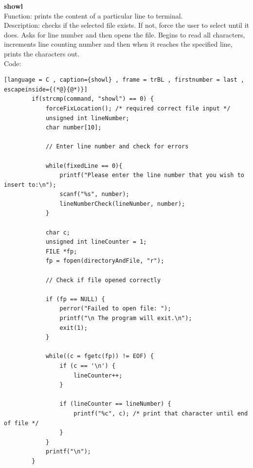 \documentclass[a4paper]{article}
\theoremstyle{plain}
\theoremstyle{definition}
\theoremstyle{remark}
\begin{document}
\textbf{showl} \\
Function: prints the content of a particular line to terminal. \\
Description: checks if the selected file exists. If not, force the user to select until it does. Asks for line number and then opens the file. Begins to read all characters, increments line counting number and then when it reaches the specified line, prints the characters out. \\
Code:
\begin{lstlisting}[language = C , caption={showl} , frame = trBL , firstnumber = last , escapeinside={(*@}{@*)}]
		if(strcmp(command, "showl") == 0) {
			forceFixLocation(); /* required correct file input */
			unsigned int lineNumber;
			char number[10];

			// Enter line number and check for errors

			while(fixedLine == 0){
				printf("Please enter the line number that you wish to insert to:\n");
				scanf("%s", number);
				lineNumberCheck(lineNumber, number);
			}

			char c;
			unsigned int lineCounter = 1;
			FILE *fp;
			fp = fopen(directoryAndFile, "r");

			// Check if file opened correctly

			if (fp == NULL) {
    			perror("Failed to open file: ");
    			printf("\n The program will exit.\n");
    			exit(1);
			}

			while((c = fgetc(fp)) != EOF) {
				if (c == '\n') {
					lineCounter++;
				}

				if (lineCounter == lineNumber) {
					printf("%c", c); /* print that character until end of file */
				}
			}
			printf("\n");
		}
\end{lstlisting}
\end{document}
